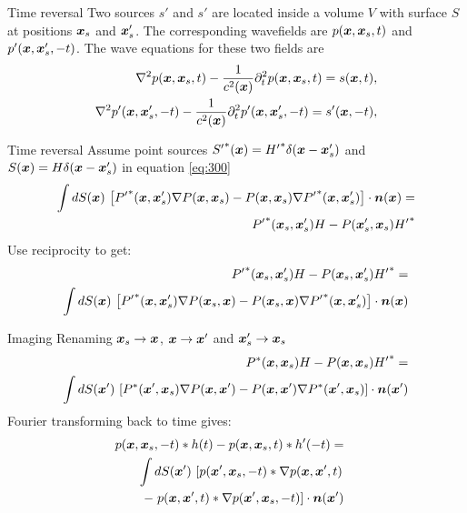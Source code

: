 \documentclass[xcolor=dvipsnames,notes]{beamer}
\begin{document}
\begin{frame}{Time reversal}
Two sources $s'$ and $s'$ are located inside a volume $V$ with surface $S$
at positions $\mbox{\boldmath $x$}_s$ and $\mbox{\boldmath $x$}'_s$.
The corresponding wavefields are $p(\mbox{\boldmath $x$},\mbox{\boldmath $x$}_s,t)$ and $p'(\mbox{\boldmath $x$},\mbox{\boldmath $x$}'_s,-t)$.
The wave equations for these two fields are
\begin{eqnarray}
\nabla^2 p(\mbox{\boldmath $x$},\mbox{\boldmath $x$}_s,t) - \frac{1}{c^2(\mbox{\boldmath $x$})} \partial^2_t p(\mbox{\boldmath $x$},\mbox{\boldmath $x$}_s,t) = s(\mbox{\boldmath $x$},t) \nonumber ,\\ 
\nabla^2 p'(\mbox{\boldmath $x$},\mbox{\boldmath $x$}'_s,-t) - \frac{1}{c^2(\mbox{\boldmath $x$})} \partial^2_t p'(\mbox{\boldmath $x$},\mbox{\boldmath $x$}'_s,-t) = s'(\mbox{\boldmath $x$},-t) \nonumber ,\\ 
\end{eqnarray}
\end{frame}
\begin{frame}{Time reversal}
Assume point sources ${S'}^*(\mbox{\boldmath $x$})={H'}^*\delta(\mbox{\boldmath $x$}-\mbox{\boldmath $x$}'_s)$ and $S(\mbox{\boldmath $x$})=H\delta(\mbox{\boldmath $x$}-\mbox{\boldmath $x$}'_s)$ in
equation \eqref{eq:300}
\begin{eqnarray}
\int dS(\xx)\, \left[{P'}^*(\xx,\xx'_s)\nabla P(\xx,\xx_s)-P(\xx,\xx_s)\nabla {P'}^*(\xx,\xx'_s)\right]\cdot \nn(\xx) = \nonumber\\
       {P'}^*(\xx_s,\xx'_s)H -P(\xx'_s,\xx_s){H'}^*
                   \label{eq:1000}
\end{eqnarray}
Use reciprocity to get:
\begin{eqnarray}
 {P'}^*(\xx_s,\xx'_s)H-P(\xx_s,\xx'_s){H'}^* = \nonumber\\
\int dS(\xx)\, \left[{P'}^*(\xx,\xx'_s)\nabla P(\xx_s,\xx)-P(\xx_s,\xx)\nabla {P'}^*(\xx,\xx'_s)\right]\cdot \nn(\xx)  \nonumber\\
                   \label{eq:2000}
\end{eqnarray}
\end{frame}
\begin{frame}{Imaging}
Renaming $\mbox{\boldmath $x$}_s \rightarrow \mbox{\boldmath $x$}$, $\mbox{\boldmath $x$} \rightarrow \mbox{\boldmath $x$}'$ and $\mbox{\boldmath $x$}'_s \rightarrow \mbox{\boldmath $x$}_s$
\begin{eqnarray}
 {P}^*(\xx,\xx_s)H-P(\xx,\xx_s){H'}^* = \nonumber\\
\int dS(\xx')\, \left[{P}^*(\xx',\xx_s)\nabla P(\xx,\xx')-P(\xx,\xx')\nabla {P}^*(\xx',\xx_s)\right]\cdot \nn(\xx')  \nonumber\\
                   \label{eq:3000}
\end{eqnarray}
Fourier transforming back to time gives:
\begin{eqnarray}
 p(\mbox{\boldmath $x$},\mbox{\boldmath $x$}_s,-t)*h(t)-p(\mbox{\boldmath $x$},\mbox{\boldmath $x$}_s,t)*h'(-t) =\nonumber\\
\int dS(\mbox{\boldmath $x$}')\, \left[p(\mbox{\boldmath $x$}',\mbox{\boldmath $x$}_s,-t)*\nabla p(\mbox{\boldmath $x$},\mbox{\boldmath $x$}',t)\right.\nonumber\\
   -\left. p(\mbox{\boldmath $x$},\mbox{\boldmath $x$}',t)*\nabla p(\mbox{\boldmath $x$}',\mbox{\boldmath $x$}_s,-t)\right]\cdot \mbox{\boldmath $n$}(\mbox{\boldmath $x$}')
&&                   \label{eq:fback}
\end{eqnarray}
\end{frame}
\end{document}
